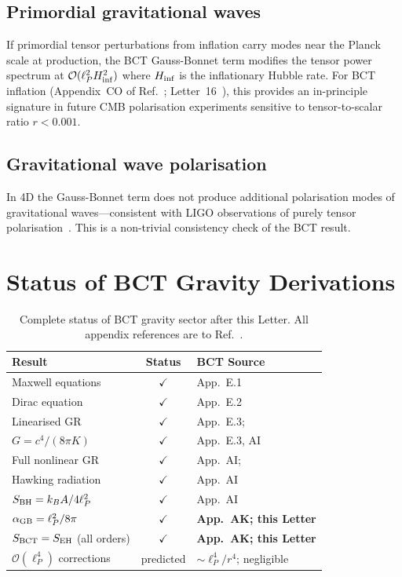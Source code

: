 \documentclass[twocolumn,10pt,a4paper]{article}
\begin{document}
\subsection*{Primordial gravitational waves}
If primordial tensor perturbations from inflation carry modes near the
Planck scale at production, the BCT Gauss-Bonnet term modifies the
tensor power spectrum at $\mathcal{O}(\ell_P^2 H_{\rm inf}^2)$ where
$H_{\rm inf}$ is the inflationary Hubble rate. For BCT inflation
(Appendix~CO of Ref.~\cite{monograph}; Letter~16~\cite{cmb}), this
provides an in-principle signature in future CMB polarisation
experiments sensitive to tensor-to-scalar ratio $r < 0.001$.

\subsection*{Gravitational wave polarisation}
In 4D the Gauss-Bonnet term does not produce additional
polarisation modes of gravitational waves---consistent with LIGO
observations of purely tensor polarisation~\cite{ligo16}. This is a
non-trivial consistency check of the BCT result.

\section*{Status of BCT Gravity Derivations}

\begin{table}[h!]
\caption{Complete status of BCT gravity sector after this Letter.
All appendix references are to Ref.~\protect\cite{monograph}.}
\label{tab:gravity_status}
\renewcommand{\arraystretch}{1.20}
\setlength{\tabcolsep}{3pt}
\begin{tabular}{@{}p{2.5cm}cp{2.4cm}@{}}
\toprule
Result & Status & BCT Source \\
\midrule
Maxwell equations       & $\checkmark$ & App.~E.1 \\
Dirac equation          & $\checkmark$ & App.~E.2 \\
Linearised GR           & $\checkmark$ & App.~E.3; \cite{unruh81,visser98} \\
$G = c^4/(8\pi K)$      & $\checkmark$ & App.~E.3, AI \\
Full nonlinear GR       & $\checkmark$ & App.~AI; \cite{deser70,bd75} \\
Hawking radiation       & $\checkmark$ & App.~AI \\
$S_{\rm BH} = k_B A/4\ell_P^2$ & $\checkmark$ & App.~AI \\
$\alpha_{\rm GB}=\ell_P^2/8\pi$ & $\checkmark$ & \textbf{App.~AK; this Letter} \\
$S_{\rm BCT}=S_{\rm EH}$ (all orders) & $\checkmark$ & \textbf{App.~AK; this Letter} \\
$\mathcal{O}(\ell_P^4)$ corrections & predicted & $\sim\ell_P^4/r^4$; negligible \\
\bottomrule
\end{tabular}
\end{table}
\end{document}
